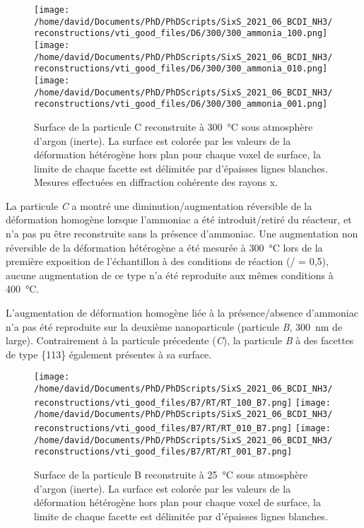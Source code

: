 \begin{figure}[!htb]
    \centering
    \texttt{[image: /home/david/Documents/PhD/PhDScripts/SixS\_2021\_06\_BCDI\_NH3/reconstructions/vti\_good\_files/D6/300/300\_ammonia\_100.png]}
    \texttt{[image: /home/david/Documents/PhD/PhDScripts/SixS\_2021\_06\_BCDI\_NH3/reconstructions/vti\_good\_files/D6/300/300\_ammonia\_010.png]}
    \texttt{[image: /home/david/Documents/PhD/PhDScripts/SixS\_2021\_06\_BCDI\_NH3/reconstructions/vti\_good\_files/D6/300/300\_ammonia\_001.png]}
    \caption{
        Surface de la particule C reconstruite à \qty{300}{\degreeCelsius} sous atmosphère d'argon (inerte).
        La surface est colorée par les valeurs de la déformation hétérogène hors plan pour chaque voxel de surface, la limite de chaque facette est délimitée par d'épaisses lignes blanches.
        Mesures effectuées en diffraction cohérente des rayons x.
    }
    \label{fig:D6FacetsFr}
\end{figure}

La particule \textit{C} a montré une diminution/augmentation réversible de la déformation homogène lorsque l'ammoniac a été introduit/retiré du réacteur, et n'a pas pu être reconstruite sans la présence d'ammoniac.
Une augmentation non réversible de la déformation hétérogène a été mesurée à \qty{300}{\degreeCelsius} lors de la première exposition de l'échantillon à des conditions de réaction (/ = 0,5), aucune augmentation de ce type n'a été reproduite aux mêmes conditions à \qty{400}{\degreeCelsius}.

L'augmentation de déformation homogène liée à la présence/absence d'ammoniac n'a pas été reproduite sur la deuxième nanoparticule (particule \textit{B}, \qty{300}{\nm} de large).
Contrairement à la particule précedente (\textit{C}), la particule \textit{B} à des facettes de type \{113\} également présentes à sa surface.

\begin{figure}[!htb]
    \centering
    \texttt{[image: /home/david/Documents/PhD/PhDScripts/SixS\_2021\_06\_BCDI\_NH3/reconstructions/vti\_good\_files/B7/RT/RT\_100\_B7.png]}
    \texttt{[image: /home/david/Documents/PhD/PhDScripts/SixS\_2021\_06\_BCDI\_NH3/reconstructions/vti\_good\_files/B7/RT/RT\_010\_B7.png]}
    \texttt{[image: /home/david/Documents/PhD/PhDScripts/SixS\_2021\_06\_BCDI\_NH3/reconstructions/vti\_good\_files/B7/RT/RT\_001\_B7.png]}
    \caption{
        Surface de la particule B reconstruite à \qty{25}{\degreeCelsius} sous atmosphère d'argon (inerte).
        La surface est colorée par les valeurs de la déformation hétérogène hors plan pour chaque voxel de surface, la limite de chaque facette est délimitée par d'épaisses lignes blanches.
    }
    \label{fig:B7FacetsFr}
\end{figure}

